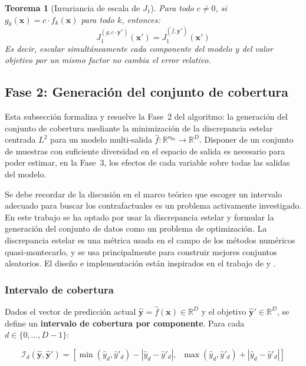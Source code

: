 \documentclass[12pt]{report} %
\newtheorem{theorem}{Teorema}
\begin{document}
\begin{theorem}[Invariancia de escala de $J_1$]\label{thm:cf-j1-scale-invariant}
    Para todo $c \neq 0$, si $g_k(\mathbf{x}) = c \cdot f_k(\mathbf{x})$ para todo $k$, entonces:
    $$J_1^{(g, c \cdot \mathbf{y}^*)}(\mathbf{x}') = J_1^{(\hat{f}, \mathbf{y}^*)}(\mathbf{x}')$$
    Es decir, escalar simultáneamente cada componente del modelo y del valor objetivo por un mismo factor no cambia el error relativo.
\end{theorem}

\subsection{Fase 2: Generación del conjunto de cobertura}

Esta subsección formaliza y resuelve la Fase~2 del algoritmo: la generación del conjunto de cobertura mediante la minimización de la discrepancia estelar centrada $L^2$ para un modelo multi-salida $\hat{f}: \mathbb{R}^{n_{\text{In}}} \to \mathbb{R}^{D}$. Disponer de un conjunto de muestras con suficiente diversidad en el espacio de salida es necesario para poder estimar, en la Fase~3, los efectos de cada variable sobre todas las salidas del modelo.

Se debe recordar de la discusión en el marco teórico que escoger un intervalo adecuado para buscar los contrafactuales es un problema activamente investigado. En este trabajo se ha optado por usar la discrepancia estelar y formular la generación del conjunto de datos como un problema de optimización. La discrepancia estelar es una métrica usada en el campo de los métodos numéricos quasi-montecarlo, y se usa principalmente para construir mejores conjuntos aleatorios. El diseño e implementación están inspirados en el trabajo de \cite{Clment2025, CLEMENT2022101645} y \cite{ZHOU2013283}.

\subsubsection{Intervalo de cobertura}

Dados el vector de predicción actual $\hat{\mathbf{y}} = \hat{f}(\mathbf{x}) \in \mathbb{R}^{D}$ y el objetivo $\hat{\mathbf{y}}' \in \mathbb{R}^{D}$, se define un \textbf{intervalo de cobertura por componente}. Para cada $d \in \{0, \ldots, D-1\}$:

\begin{equation}
    \mathcal{I}_d(\hat{\mathbf{y}}, \hat{\mathbf{y}}') = \left[\min(\hat{y}_d, \hat{y}'_d) - |\hat{y}_d - \hat{y}'_d|,\;\; \max(\hat{y}_d, \hat{y}'_d) + |\hat{y}_d - \hat{y}'_d|\right]
    \label{eq:formal_coverage_interval}
\end{equation}
\end{document}
